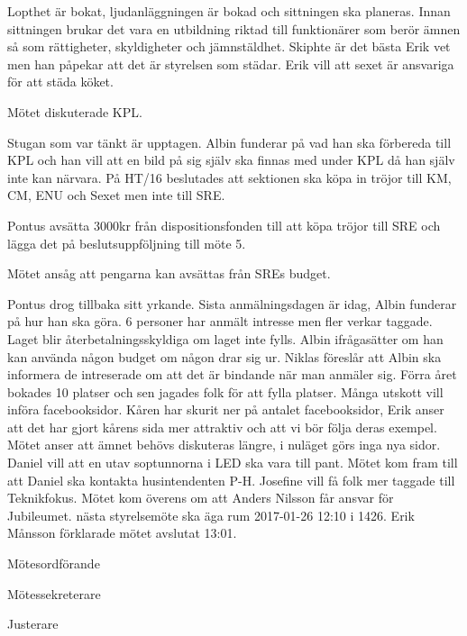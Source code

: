\documentclass[10pt]{article}
\def\mo{Erik Månsson}
\def\ms{Johan Karlberg}
\def\ji{Pontus Landgren}
\begin{document}
\begin{paragrafer}
Lopthet är bokat, ljudanläggningen är bokad och sittningen ska planeras.
Innan sittningen brukar det vara en utbildning riktad till funktionärer som berör ämnen så som rättigheter, skyldigheter och jämnstäldhet.
Skiphte är det bästa Erik vet men han påpekar att det är styrelsen som städar.
Erik vill att sexet är ansvariga för att städa köket.

Mötet diskuterade KPL.

Stugan som var tänkt är upptagen.
Albin funderar på vad han ska förbereda till KPL och han vill att en bild på sig själv ska finnas med under KPL då han själv inte kan närvara.
På HT/16 beslutades att sektionen ska köpa in tröjor till KM, CM, ENU och Sexet men inte till SRE.

Pontus \ypa avsätta 3000kr från dispositionsfonden till att köpa tröjor till SRE och lägga det på beslutsuppföljning till möte 5.

Mötet ansåg att pengarna kan avsättas från SREs budget.

Pontus drog tillbaka sitt yrkande.
Sista anmälningsdagen är idag, Albin funderar på hur han ska göra. 6 personer har anmält intresse men fler verkar taggade.
Laget blir återbetalningsskyldiga om laget inte fylls.
Albin ifrågasätter om han kan använda någon budget om någon drar sig ur.
Niklas föreslår att Albin ska informera de intreserade om att det är bindande när man anmäler sig. Förra året bokades 10 platser och sen jagades folk för att fylla platser.
Många utskott vill införa facebooksidor.
Kåren har skurit ner på antalet facebooksidor, Erik anser att det har gjort kårens sida mer attraktiv och att vi bör följa deras exempel.
Mötet anser att ämnet behövs diskuteras längre, i nuläget görs inga nya sidor.
Daniel vill att en utav soptunnorna i LED ska vara till pant.
Mötet kom fram till att Daniel ska kontakta husintendenten P-H.
Josefine vill få folk mer taggade till Teknikfokus.
Mötet kom överens om att Anders Nilsson får ansvar för Jubileumet.
{\Mba} nästa styrelsemöte ska äga rum 2017-01-26 12:10 i 1426.
{\Ibfu}
{\mo} förklarade mötet avslutat 13:01.
\end{paragrafer}

\hidesignfoot
\begin{signatures}{3}
\signature{\mo}{Mötesordförande}
\signature{\ms}{Mötessekreterare}
\signature{\ji}{Justerare}
\end{signatures}
\end{document}
